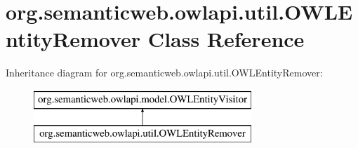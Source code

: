 \hypertarget{classorg_1_1semanticweb_1_1owlapi_1_1util_1_1_o_w_l_entity_remover}{\section{org.\-semanticweb.\-owlapi.\-util.\-O\-W\-L\-Entity\-Remover Class Reference}
\label{classorg_1_1semanticweb_1_1owlapi_1_1util_1_1_o_w_l_entity_remover}
}
Inheritance diagram for org.\-semanticweb.\-owlapi.\-util.\-O\-W\-L\-Entity\-Remover\-:\begin{figure}[H]
\begin{center}
\leavevmode
\includegraphics[height=2.000000cm]{classorg_1_1semanticweb_1_1owlapi_1_1util_1_1_o_w_l_entity_remover}
\end{center}
\end{figure}
